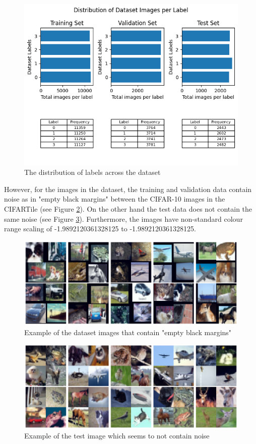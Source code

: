 \documentclass{article}
\begin{document}
\begin{figure}[H]
    \centering
    \includegraphics[width=0.7\linewidth]{images/dist_labels.png}
    \caption{The distribution of labels across the dataset}
    \label{fig:dist_labels}
\end{figure}

However, for the images in the dataset, the training and validation data
contain noise as in "empty black margins" between the CIFAR-10 images
in the CIFARTile (see Figure \ref{fig:org_img_train_valid}). On the
other hand the test data does not contain the same noise (see Figure
\ref{fig:test_img}). Furthermore, the images have non-standard colour
range scaling of -1.9892120361328125 to -1.9892120361328125.

\begin{figure}[H]
    \centering
    \includegraphics[width=0.7\linewidth]{images/org_img_train_valid.png}
    \caption{Example of the dataset images that contain "empty black margins"}
    \label{fig:org_img_train_valid}
\end{figure}

\begin{figure}[H]
    \centering
    \includegraphics[width=0.7\linewidth]{images/test_img.png}
    \caption{Example of the test image which seems to not contain noise}
    \label{fig:test_img}
\end{figure}
\end{document}
